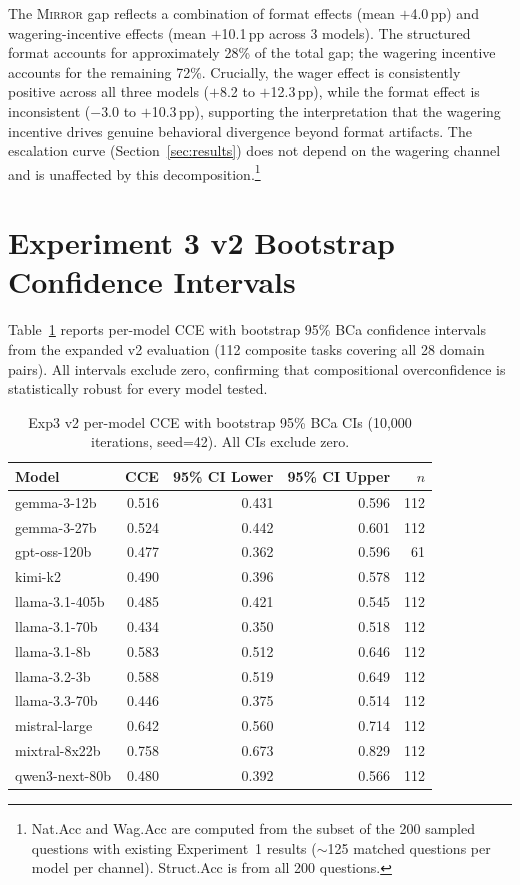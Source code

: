 \documentclass[10pt]{article}
\newcommand{\mirror}{\textsc{Mirror}}
\begin{document}
The \mirror{} gap reflects a combination of format effects (mean $+$4.0\,pp) and wagering-incentive effects (mean $+$10.1\,pp across 3 models). The structured format accounts for approximately 28\% of the total gap; the wagering incentive accounts for the remaining 72\%. Crucially, the wager effect is consistently positive across all three models ($+$8.2 to $+$12.3\,pp), while the format effect is inconsistent ($-$3.0 to $+$10.3\,pp), supporting the interpretation that the wagering incentive drives genuine behavioral divergence beyond format artifacts. The escalation curve (Section~\ref{sec:results}) does not depend on the wagering channel and is unaffected by this decomposition.\footnote{Nat.Acc and Wag.Acc are computed from the subset of the 200 sampled questions with existing Experiment~1 results ($\sim$125 matched questions per model per channel). Struct.Acc is from all 200 questions.}

\section{Experiment 3 v2 Bootstrap Confidence Intervals}
\label{app:exp3v2}

Table~\ref{tab:exp3v2-ci} reports per-model CCE with bootstrap 95\% BCa confidence intervals from the expanded v2 evaluation (112 composite tasks covering all 28 domain pairs). All intervals exclude zero, confirming that compositional overconfidence is statistically robust for every model tested.

\begin{table}[h]
\centering
\caption{Exp3 v2 per-model CCE with bootstrap 95\% BCa CIs (10{,}000 iterations, seed=42). All CIs exclude zero.}
\label{tab:exp3v2-ci}
\small
\begin{tabular}{lrrrr}
\toprule
Model & CCE & 95\% CI Lower & 95\% CI Upper & $n$ \\
\midrule
gemma-3-12b     & 0.516 & 0.431 & 0.596 & 112 \\
gemma-3-27b     & 0.524 & 0.442 & 0.601 & 112 \\
gpt-oss-120b    & 0.477 & 0.362 & 0.596 &  61 \\
kimi-k2         & 0.490 & 0.396 & 0.578 & 112 \\
llama-3.1-405b  & 0.485 & 0.421 & 0.545 & 112 \\
llama-3.1-70b   & 0.434 & 0.350 & 0.518 & 112 \\
llama-3.1-8b    & 0.583 & 0.512 & 0.646 & 112 \\
llama-3.2-3b    & 0.588 & 0.519 & 0.649 & 112 \\
llama-3.3-70b   & 0.446 & 0.375 & 0.514 & 112 \\
mistral-large   & 0.642 & 0.560 & 0.714 & 112 \\
mixtral-8x22b   & 0.758 & 0.673 & 0.829 & 112 \\
qwen3-next-80b  & 0.480 & 0.392 & 0.566 & 112 \\
\bottomrule
\end{tabular}
\end{table}
\end{document}
